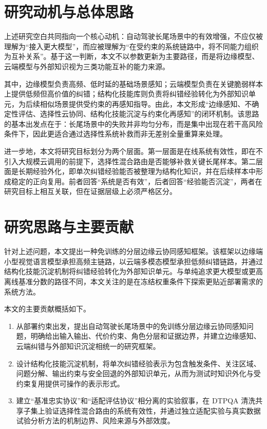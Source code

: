 \section{研究动机与总体思路}
\label{sec:intro-motivation}

上述研究空白共同指向一个核心动机：自动驾驶长尾场景中的有效增强，不应仅被理解为“接入更大模型”，而应被理解为“在受约束的系统链路中，将不同能力组织为互补关系”。基于这一判断，本文不以参数更新为主要路径，而是将边缘模型、云端模型与外部知识视为三类功能互补的能力来源。

其中，边缘模型负责高频、低时延的基础场景感知；云端模型负责在关键脆弱样本上提供低频但高价值的纠错；结构化技能库则负责将纠错经验转化为外部知识单元，为后续相似场景提供受约束的再感知指导。由此，本文形成“边缘感知、不确定性评估、选择性云协同、结构化技能沉淀与约束化再感知”的闭环机制。该思路的基本出发点在于：长尾场景中的失败并非均匀分布，而是集中出现在若干高风险条件下，因此更适合通过选择性系统补救而非无差别全量重算来处理。

进一步地，本文将研究目标划分为两个层面。第一层面是在线系统有效性，即在不引入大规模云调用的前提下，选择性混合路由是否能够补救关键长尾样本。第二层面是长期经验外化，即单次纠错经验能否被整理为结构化知识，并在后续样本中形成稳定的正向复用。前者回答“系统是否有效”，后者回答“经验能否沉淀”，两者在研究目标上相互关联，但在证据层级上必须严格区分。

\section{研究思路与主要贡献}
\label{sec:intro-contribution}

针对上述问题，本文提出一种免训练的分层边缘云协同感知框架。该框架以边缘端小型视觉语言模型承担高频主链路，以云端多模态模型承担低频纠错链路，并通过结构化技能沉淀机制将纠错经验转化为外部知识单元。与单纯追求更大模型或更高离线基准分数的路径不同，本文关注的是在冻结权重条件下探索更贴近部署需求的系统方法。

本文的主要贡献概括如下。

\begin{enumerate}
  \item 从部署约束出发，提出自动驾驶长尾场景中的免训练分层边缘云协同感知问题，明确给出输入输出、代价约束、角色分层和证据边界，并建立边缘感知、云端纠错与外部知识沉淀相统一的研究框架。
  \item 设计结构化技能沉淀机制，将单次纠错经验表示为包含触发条件、关注区域、问题分解、输出约束与安全回退的外部知识单元，从而为测试时知识外化与受约束复用提供可操作的表示形式。
  \item 建立“基准忠实协议”和“适配评估协议”相分离的实验叙事，在 DTPQA 清洗共享子集上验证选择性混合路由的系统有效性，并通过独立适配实验与真实数据试验分析方法的机制边界、风险来源与外部效度。
\end{enumerate}

